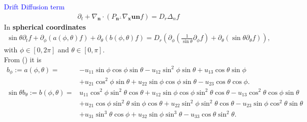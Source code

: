 \begin{frame}
	\scriptsize
	\textcolor{blue}{Drift Diffusion term}
	\begin{align*}
		\partial_t +\nabla_{\boldsymbol{n}} \cdot\left(P_{\boldsymbol{n}^{\perp}}\nabla_{\boldsymbol{x}} \boldsymbol{u} \boldsymbol{n} f\right) =D_r \Delta_n f
	\end{align*}
	\pause
	In \textbf{spherical coordinates}
	\begin{align}
		\sin \theta \partial_t f + \partial_\phi\left(a(\phi, \theta) f\right)+\partial_\theta\left(b(\phi, \theta) f\right) = D_r \left(\partial_\phi\left(\frac{1}{\sin \theta} \partial_\phi f\right)+\partial_\theta\left(\sin \theta \partial_\theta f\right)\right), \label{Smochluch_S2}
	\end{align}
	with $\phi \in [0, 2 \pi]$ and $\theta \in [0, \pi]$. \\
	\pause
	\vspace{8mm}
	From (\cite{zbMATH05037679}) it is
	\begin{align*}
		b_\phi := a(\phi, \theta) = & -u_{11} \sin \phi \cos \phi \sin \theta-u_{12} \sin ^2 \phi \sin \theta+u_{13} \cos \theta \sin \phi \\
		& +u_{21} \cos ^2 \phi \sin \theta+u_{22} \sin \phi \cos \phi \sin \theta-u_{23} \cos \theta \cos \phi.\\
		\sin \theta b_\theta := b(\phi, \theta)= & u_{11} \cos ^2 \phi \sin ^2 \theta \cos \theta+u_{12} \sin \phi \cos \phi \sin ^2 \theta \cos \theta-u_{13} \cos ^2 \theta \cos \phi \sin \theta \\
		& +u_{21} \cos \phi \sin ^2 \theta \sin \phi \cos \theta+u_{22} \sin ^2 \phi \sin ^2 \theta \cos \theta-u_{23} \sin \phi \cos ^2 \theta \sin \theta \\
		& +u_{31} \sin ^3 \theta \cos \phi+u_{32} \sin \phi \sin ^3 \theta-u_{33} \cos \theta \sin ^2 \theta.
	\end{align*}
\end{frame}

